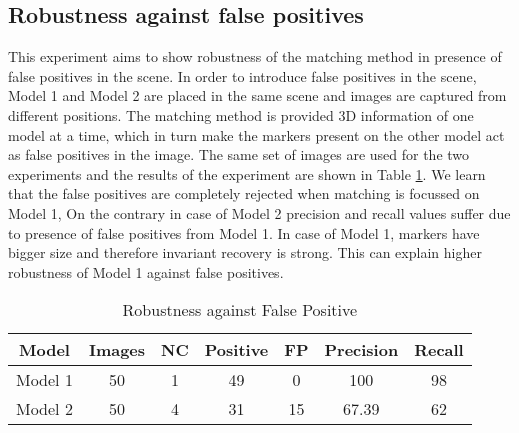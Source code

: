 \documentclass{bmvc2k}
\begin{document}
\subsection{Robustness against false positives}
This experiment aims to show robustness of the matching method in presence of false positives in the scene. 
In order to introduce false positives in the scene, Model 1 and Model 2 are placed in the same scene and images are captured from different positions. 
The matching method is provided 3D information of one model at a time, which in turn make the markers present on the other model act as false positives in the image. 
The same set of images are used for the two experiments and the results of the experiment are shown in Table \ref{tab:Exp3}.
We learn that the false positives are completely rejected when matching is focussed on Model 1, On the contrary in case of Model 2 precision and recall values suffer due to presence of false positives from Model 1. 
In case of Model 1, markers have bigger size and therefore invariant recovery is strong. This can explain higher robustness of Model 1 against false positives. 
\begin{table}[h]
\centering
\caption{Robustness against False Positive } 
\begin{tabular}{ | c | c | c | c | c | c | c |}
\hline
Model & Images & NC & Positive & FP & Precision & Recall \\ \hline
Model 1 & 50 & 1  & 49 & 0  & 100 & 98 \\
Model 2 & 50 & 4 & 31 & 15  & 67.39 & 62 \\ \hline
\end{tabular} \\
\label{tab:Exp3}
\end{table}
\end{document}
